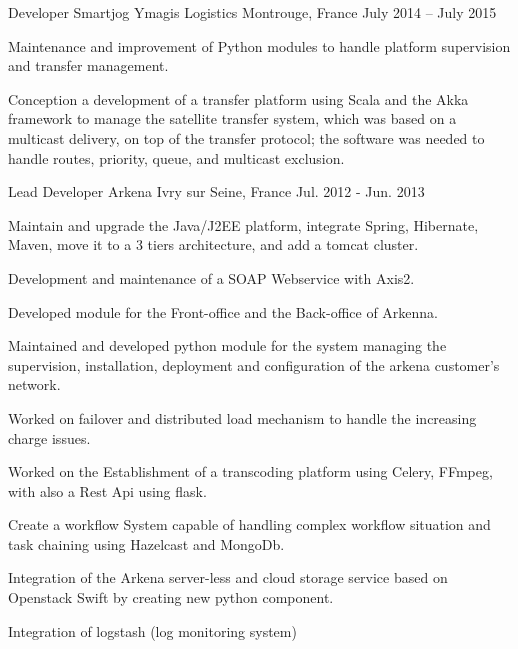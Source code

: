 \begin{cventries}
  \cventry
    {Developer} %
    {Smartjog Ymagis Logistics} %
    {Montrouge, France} %
    {July 2014 – July 2015} %
    {
      \begin{cvitems} %
        \item {Maintenance and improvement of Python modules to handle platform supervision and transfer management.}
        \item {Conception a development of a transfer platform using Scala and the Akka framework to manage the satellite transfer system, which was based on a multicast delivery, on top of the transfer protocol; the software was needed to handle routes, priority, queue, and multicast exclusion.}
      \end{cvitems} 
    }

  \cventry
    {Lead Developer} %
    {Arkena} %
    {Ivry sur Seine, France} %
    {Jul. 2012 - Jun. 2013} %
    {
      \begin{cvitems} %
        \item {Maintain and upgrade the Java/J2EE platform, integrate Spring, Hibernate, Maven, move it to a 3 tiers architecture, and add a tomcat cluster.}
        \item {Development and maintenance of a SOAP Webservice with Axis2.}
        \item {Developed module for the Front-office and the Back-office of Arkenna.}
        \item {Maintained and developed python module for the system managing the supervision, installation, deployment and configuration of the arkena customer’s network.}
        \item {Worked on failover and distributed load mechanism to handle the increasing charge issues.}
        \item {Worked on the Establishment of a transcoding platform using Celery, FFmpeg, with also a Rest Api using flask.}
        \item {Create a workflow System capable of handling complex workflow situation and task chaining using Hazelcast and MongoDb.}
        \item {Integration of the Arkena server-less and cloud storage service based on Openstack Swift by creating new python component.}
        \item {Integration of logstash (log monitoring system)}
      \end{cvitems}
    }


\end{cventries}
